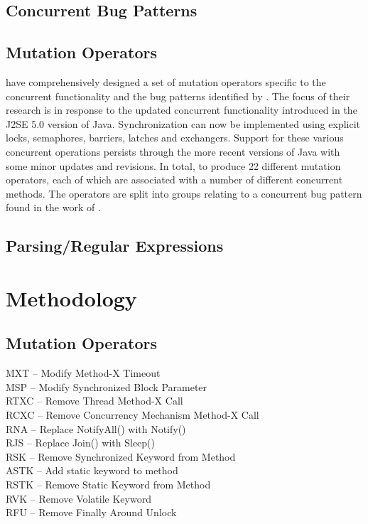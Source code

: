 \documentclass[a4paper,12pt]{article}
\begin{document}
\subsection{Concurrent Bug Patterns}
    
    
    
\subsection{Mutation Operators}
\citet{bradbury06} have comprehensively designed a set of mutation operators specific to the concurrent functionality and the bug patterns identified by \citet{farchi03}. The focus of their research is in response to the updated concurrent functionality introduced in the J2SE 5.0 version of Java. Synchronization can now be implemented using explicit locks, semaphores, barriers, latches and exchangers. Support for these various concurrent operations persists through the more recent versions of Java with some minor updates and revisions. In total, \citeauthor{bradbury06} to produce 22 different mutation operators, each of which are associated with a number of different concurrent methods. The operators are split into groups relating to a concurrent bug pattern found in the work of \citeauthor{farchi03}.


\subsection{Parsing/Regular Expressions}



\newpage
\section{Methodology}
\subsection{Mutation Operators}

MXT – Modify Method-X Timeout
\\MSP – Modify Synchronized Block Parameter
\\RTXC – Remove Thread Method-X Call
\\RCXC – Remove Concurrency Mechanism Method-X Call 
\\RNA – Replace NotifyAll() with Notify()
\\RJS – Replace Join() with Sleep()
\\RSK – Remove Synchronized Keyword from Method
\\ASTK – Add static keyword to method
\\RSTK – Remove Static Keyword from Method
\\RVK – Remove Volatile Keyword
\\RFU – Remove Finally Around Unlock
\end{document}

